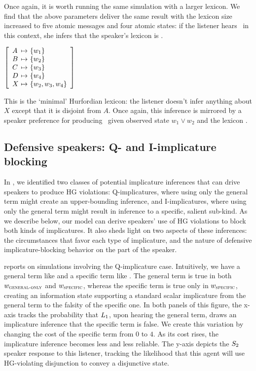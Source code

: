 \documentclass[12pt,twoside]{article}
\renewcommand{\_}{\textbf{\textunderscore\hspace{-4pt}\textunderscore\hspace{-3pt}\textunderscore\hspace{-4pt}\textunderscore}\hspace{0.5pt}}			%
\begin{document}
Once again, it is worth running the same simulation with a larger
lexicon. We find that the above parameters deliver the same result
with the lexicon size increased to five atomic messages and four
atomic states: if the listener hears \AorX\ in this context,
she infers that the speaker's lexicon is .
%
\begin{exe}
\ex\label{hurford-lex-large}  
  $\left[
    \begin{array}[c]{l@{ \ \mapsto \ }l}
      A & \set{w_{1}} \\
      B & \set{w_{2}} \\
      C & \set{w_{3}} \\
      D & \set{w_{4}} \\
      X & \set{w_{2}, w_{3}, w_{4}}
    \end{array}
  \right]$
\end{exe}
%
This is the `minimal' Hurfordian lexicon: the listener doesn't infer
anything about $X$ except that it is disjoint from $A$. Once again,
this inference is mirrored by a speaker preference for producing
\AorX\ given observed state $w_{1} \vee w_{2}$ and the lexicon
.


\subsection{Defensive speakers: Q- and I-implicature blocking}
\label{sec:defensive-speakers}

In , we identified two classes of
potential implicature inferences that can drive speakers to produce HG
violations: Q-implicatures, where using only the general term might
create an upper-bounding inference, and I-implicatures, where using
only the general term might result in inference to a specific, salient
sub-kind. As we describe below, our model can derive speakers' use of
HG violations to block both kinds of implicatures. It also sheds light
on two aspects of these inferences: the circumstances that favor each
type of implicature, and the nature of defensive implicature-blocking
behavior on the part of the speaker.

 reports on simulations involving the Q-implicature
case. Intuitively, we have a general term like  and a
specific term like . The general term is true in both
$w_\textsc{general-only}$ and $w_\textsc{specific}$, whereas the
specific term is true only in $w_\textsc{specific}$, creating an
information state supporting a standard scalar implicature from the
general term to the falsity of the specific one.  In both panels of
this figure, the x-axis tracks the probability that $\ListenerK[1]$,
upon hearing the general term, draws an implicature inference that the
specific term is false. We create this variation by changing the cost
of the specific term from $0$ to $4$. As its cost rises, the
implicature inference becomes less and less reliable.  The y-axis
depicts the $\SpeakerK[2]$ speaker response to this listener, tracking
the likelihood that this agent will use HG-violating disjunction to
convey a disjunctive state.
\end{document}
